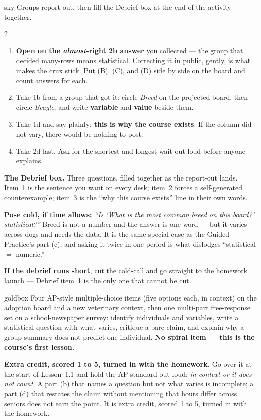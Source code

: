\documentclass[10pt]{article}
\begin{document}
\boxguard
\begin{skillbox}{sky}
Groups report out, then fill the Debrief box at the end of the activity together.
\begin{multicols}{2}
\begin{enumerate}[leftmargin=1.3em, nosep, itemsep=3pt]
  \item \textbf{Open on the \emph{almost}-right 2b answer} you collected --- the group that
        decided many-rows means statistical. Correcting it in public, gently, is what makes the
        crux stick. Put (B), (C), and (D) side by side on the board and count answers for each.
  \item Take 1b from a group that got it: circle \emph{Breed} on the projected board, then
        circle \emph{Beagle}, and write \textbf{variable} and \textbf{value} beside them.
  \item Take 1d and say plainly: \textbf{this is why the course exists}. If the column did not
        vary, there would be nothing to post.
  \item Take 2d last. Ask for the shortest and longest wait out loud before anyone explains.
\end{enumerate}
\columnbreak
\textbf{The Debrief box.} Three questions, filled together as the report-out lands. Item~1 is
the sentence you want on every desk; item~2 forces a self-generated counterexample; item~3 is
the ``why this course exists'' line in their own words.

\textbf{Pose cold, if time allows:} \emph{``Is `What is the most common breed on this board?'
statistical?''} Breed is not a number and the answer is one word --- but it varies across dogs
and needs the data. It is the same special case as the Guided Practice's part (c), and asking it
twice in one period is what dislodges ``statistical $=$ numeric.''

\textbf{If the debrief runs short}, cut the cold-call and go straight to the homework launch ---
Debrief item~1 is the only one that cannot be cut.
\end{multicols}
\end{skillbox}

\boxguard
\begin{skillbox}{goldbox}
Four AP-style multiple-choice items (five options each, in context) on the adoption board and a
new veterinary context, then one multi-part free-response set on a school-newspaper survey:
identify individuals and variables, write a statistical question with what varies, critique a
bare claim, and explain why a group summary does not predict one individual. \textbf{No spiral item --- this is the course's first lesson.}

\textbf{Extra credit, scored 1 to 5, turned in with the homework.} Go over it at
the start of Lesson~1.1 and hold the AP standard out loud: \emph{in context or it does not
count}. A part (b) that names a question but not what varies is incomplete; a part (d) that
restates the claim without mentioning that hours differ across seniors does not earn the point.
It is extra credit, scored 1 to 5, turned in with the homework.
\end{skillbox}
\end{document}
